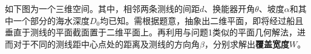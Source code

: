 
如下图为一个三维空间。其中，相邻两条测线的间距$d$、换能器开角$\theta$、坡度$\alpha$和其中一个部分的海水深度$D_0$均已知。需根据题意，抽象出二维平面，即将经过船且垂直于测线的平面截面置于二维平面上。再利用与问题1类似的平面几何解法，进而对于不同的测线距中心点处的距离及测线的方向角$\beta$，分别求解出\textbf{覆盖宽度}$W$。




